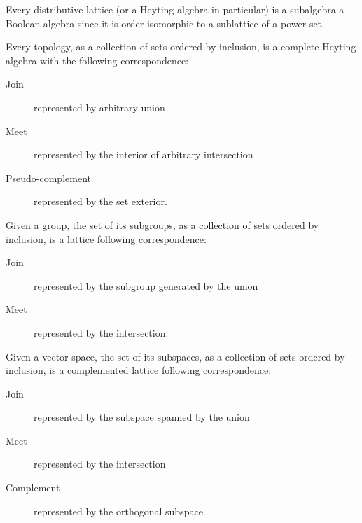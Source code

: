 \documentclass{article}
\begin{document}
\begin{prop}
	Every distributive lattice (or a Heyting algebra in particular) is a subalgebra a Boolean algebra since it is order isomorphic to a sublattice of a power set.
\end{prop}

\begin{prop}[Topology]
	Every topology, as a collection of sets ordered by inclusion, is a complete Heyting algebra with the following correspondence:
	\begin{description}
		\item[Join] represented by arbitrary union
		\item[Meet] represented by the interior of arbitrary intersection
		\item[Pseudo-complement] represented by the set exterior.
	\end{description}
\end{prop}

\begin{prop}
	Given a group, the set of its subgroups, as a collection of sets ordered by inclusion, is a lattice following correspondence:
	\begin{description}
		\item[Join] represented by the subgroup generated by the union
		\item[Meet] represented by the intersection.
	\end{description}
\end{prop}

\begin{prop}
	Given a vector space, the set of its subspaces, as a collection of sets ordered by inclusion, is a complemented lattice following correspondence:
	\begin{description}
		\item[Join] represented by the subspace spanned by the union
		\item[Meet] represented by the intersection
		\item[Complement] represented by the orthogonal subspace.
	\end{description}
\end{prop}
\end{document}
